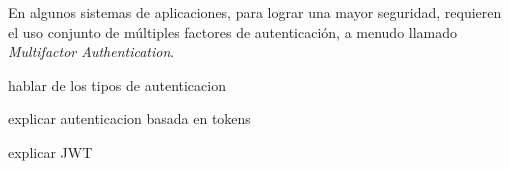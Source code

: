 En algunos sistemas de aplicaciones, para lograr una mayor seguridad, requieren el uso conjunto de múltiples factores de autenticación, a menudo llamado \textit{Multifactor Authentication}.

hablar de los tipos de autenticacion

explicar autenticacion basada en tokens 

explicar JWT



%
%
%
%

